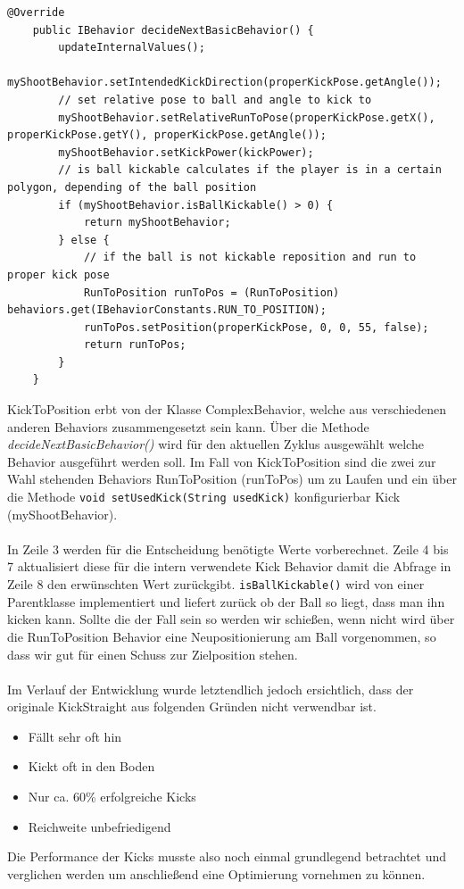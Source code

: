 \documentclass[fontsize=12pt,a4paper,final]{scrartcl}[2003/01/01]
\begin{document}
\begin{lstlisting}[caption=KickToPosition, captionpos=b, label=lst:KickToPosition]
 @Override
    public IBehavior decideNextBasicBehavior() {
        updateInternalValues();
        myShootBehavior.setIntendedKickDirection(properKickPose.getAngle());
        // set relative pose to ball and angle to kick to
        myShootBehavior.setRelativeRunToPose(properKickPose.getX(), properKickPose.getY(), properKickPose.getAngle());
        myShootBehavior.setKickPower(kickPower);
        // is ball kickable calculates if the player is in a certain polygon, depending of the ball position
        if (myShootBehavior.isBallKickable() > 0) {
            return myShootBehavior;
        } else {
            // if the ball is not kickable reposition and run to proper kick pose
            RunToPosition runToPos = (RunToPosition) behaviors.get(IBehaviorConstants.RUN_TO_POSITION);
            runToPos.setPosition(properKickPose, 0, 0, 55, false);
            return runToPos;
        }
    }
\end{lstlisting}

KickToPosition erbt von der Klasse ComplexBehavior, welche aus verschiedenen anderen Behaviors zusammengesetzt sein kann. Über die Methode \textit{decideNextBasicBehavior()} wird für den aktuellen Zyklus ausgewählt welche Behavior ausgeführt werden soll. Im Fall von KickToPosition sind die zwei zur Wahl stehenden Behaviors  RunToPosition (runToPos) um zu Laufen und ein über die Methode \texttt{void setUsedKick(String usedKick)} konfigurierbar Kick (myShootBehavior).\\
\\
In Zeile 3 werden für die Entscheidung benötigte Werte vorberechnet. Zeile 4 bis 7 aktualisiert diese für die intern verwendete Kick Behavior damit die Abfrage in Zeile 8 den erwünschten Wert zurückgibt.  \texttt{isBallKickable()} wird von einer Parentklasse implementiert und liefert zurück ob der Ball so liegt, dass man ihn kicken kann. Sollte die der Fall sein so werden wir schießen, wenn nicht wird über die RunToPosition Behavior eine Neupositionierung am Ball vorgenommen, so dass wir gut für einen Schuss zur Zielposition stehen.\\
\\
Im Verlauf der Entwicklung wurde letztendlich jedoch ersichtlich, dass der originale KickStraight aus folgenden Gründen nicht verwendbar ist.
\begin{itemize}
\item Fällt sehr oft hin
\item Kickt oft in den Boden
\item Nur ca. 60\% erfolgreiche Kicks
\item Reichweite unbefriedigend
\end{itemize}
Die Performance der Kicks musste also noch einmal grundlegend betrachtet und verglichen werden um anschließend eine Optimierung vornehmen zu können.
\end{document}
